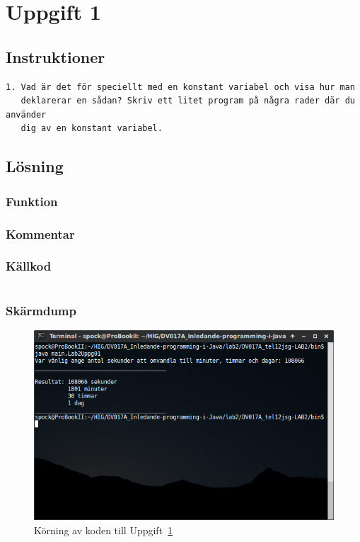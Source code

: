 \section{Uppgift 1}\label{sec:uppg01}

\subsection{Instruktioner}
\begin{verbatim}
1. Vad är det för speciellt med en konstant variabel och visa hur man
   deklarerar en sådan? Skriv ett litet program på några rader där du använder
   dig av en konstant variabel.
\end{verbatim}


\subsection{Lösning}
\subsubsection{Funktion}

\subsubsection{Kommentar}

\cite{jle:static}



\subsubsection{Källkod}
\inputminted[linenos]{java}{src/main/Lab2Uppg01.java}
\label{src:uppg01}


\subsubsection{Skärmdump}
\begin{figure}[htbp]
    \centering
        \includegraphics[width=\linewidth]{img/01.png}
    \caption{Körning av koden till Uppgift~\ref{sec:uppg01}}
\label{fig:uppg01-screenshot}
\end{figure}

